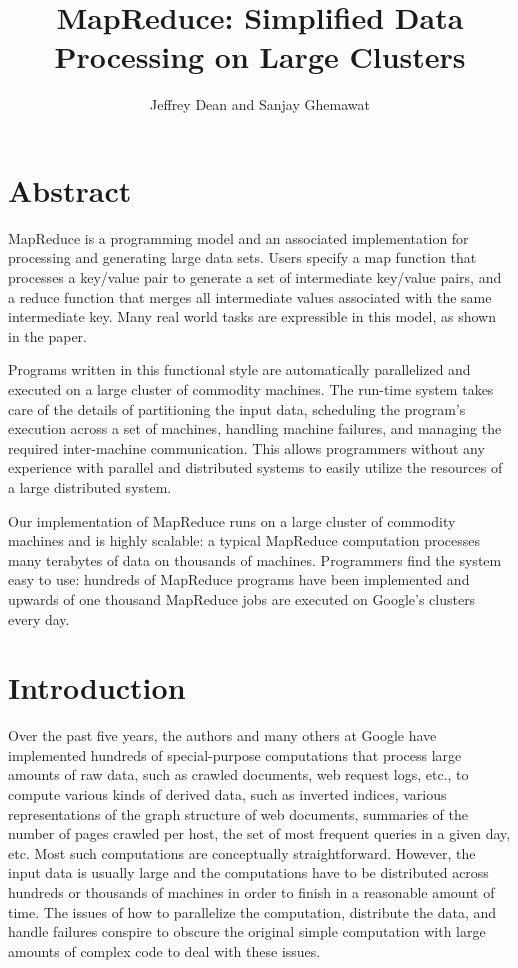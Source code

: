 \documentclass[a4paper,12pt]{article}
\author{Jeffrey Dean and Sanjay Ghemawat}
\title{MapReduce: Simplified Data Processing on Large Clusters}
\begin{document}
	
	\maketitle
	\section{Abstract}
	
	MapReduce is a programming model and an associated implementation for processing and generating large
	data sets. Users specify a map function that processes a
	key/value pair to generate a set of intermediate key/value
	pairs, and a reduce function that merges all intermediate
	values associated with the same intermediate key. Many
	real world tasks are expressible in this model, as shown
	in the paper.
	
	Programs written in this functional style are automatically parallelized and executed on a large cluster of commodity machines. The run-time system takes care of the
	details of partitioning the input data, scheduling the program’s execution across a set of machines, handling machine failures, and managing the required inter-machine
	communication. This allows programmers without any
	experience with parallel and distributed systems to easily utilize the resources of a large distributed system.
	
	Our implementation of MapReduce runs on a large
	cluster of commodity machines and is highly scalable:
	a typical MapReduce computation processes many terabytes of data on thousands of machines. Programmers
	find the system easy to use: hundreds of MapReduce programs have been implemented and upwards of one thousand MapReduce jobs are executed on Google’s clusters
	every day.
		\section{Introduction}
	Over the past five years, the authors and many others at
	Google have implemented hundreds of special-purpose
	computations that process large amounts of raw data,
	such as crawled documents, web request logs, etc., to
	compute various kinds of derived data, such as inverted
	indices, various representations of the graph structure
	of web documents, summaries of the number of pages
	crawled per host, the set of most frequent queries in a
	given day, etc. Most such computations are conceptually straightforward. However, the input data is usually
	large and the computations have to be distributed across
	hundreds or thousands of machines in order to finish in
	a reasonable amount of time. The issues of how to parallelize the computation, distribute the data, and handle
	failures conspire to obscure the original simple computation with large amounts of complex code to deal with
	these issues.
	
\end{document}
